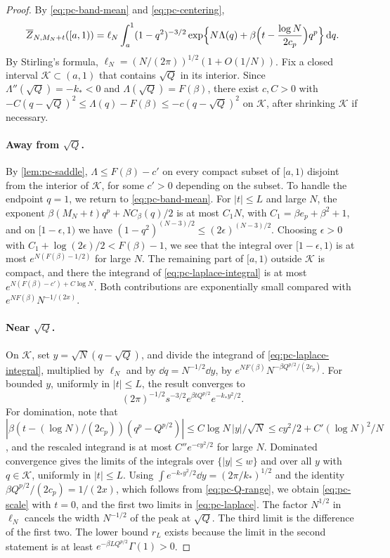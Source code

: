\begin{proof}
By \eqref{eq:pc-band-mean} and \eqref{eq:pc-centering},
\begin{equation}\label{eq:pc-laplace-integral}
\overline Z_{N,M_N+t}([a,1))=\ell_N\int_a^1(1-q^2)^{-3/2}\exp\Bigl\{N\Lambda(q)+\beta\Bigl(t-\frac{\log N}{2c_p}\Bigr)q^p\Bigr\}\,\mathrm d q.
\end{equation}
By Stirling's formula, $\ell_N=(N/(2\pi))^{1/2}(1+O(1/N))$. Fix a closed interval $\mathcal K\subset(a,1)$ that contains $\sqrt Q$ in its interior. Since $\Lambda''(\sqrt Q)=-k_*<0$ and $\Lambda(\sqrt Q)=F(\beta)$, there exist $c,C>0$ with $-C(q-\sqrt Q)^2\le\Lambda(q)-F(\beta)\le-c(q-\sqrt Q)^2$ on $\mathcal K$, after shrinking $\mathcal K$ if necessary.

\paragraph{Away from $\sqrt Q$.}
By \cref{lem:pc-saddle}, $\Lambda\le F(\beta)-c'$ on every compact subset of $[a,1)$ disjoint from the interior of $\mathcal K$, for some $c'>0$ depending on the subset. To handle the endpoint $q=1$, we return to \eqref{eq:pc-band-mean}. For $|t|\le L$ and large $N$, the exponent $\beta(M_N+t)q^p+NC_\beta(q)/2$ is at most $C_1N$, with $C_1=\beta e_p+\beta^2+1$, and on $[1-\epsilon,1)$ we have $(1-q^2)^{(N-3)/2}\le(2\epsilon)^{(N-3)/2}$. Choosing $\epsilon>0$ with $C_1+\log(2\epsilon)/2<F(\beta)-1$, we see that the integral over $[1-\epsilon,1)$ is at most $e^{N(F(\beta)-1/2)}$ for large $N$. The remaining part of $[a,1)$ outside $\mathcal K$ is compact, and there the integrand of \eqref{eq:pc-laplace-integral} is at most $e^{N(F(\beta)-c')+C\log N}$. Both contributions are exponentially small compared with $e^{NF(\beta)}N^{-1/(2x)}$.

\paragraph{Near $\sqrt Q$.}
On $\mathcal K$, set $y=\sqrt N(q-\sqrt Q)$, and divide the integrand of \eqref{eq:pc-laplace-integral}, multiplied by $\ell_N$ and by $\dd q=N^{-1/2}\dd y$, by $e^{NF(\beta)}N^{-\beta Q^{p/2}/(2c_p)}$. For bounded $y$, uniformly in $|t|\le L$, the result converges to
\[
(2\pi)^{-1/2}s^{-3/2}e^{\beta tQ^{p/2}}e^{-k_*y^2/2}.
\]
For domination, note that $|\beta(t-(\log N)/(2c_p))(q^p-Q^{p/2})|\le C\log N\,|y|/\sqrt N\le cy^2/2+C'(\log N)^2/N$, and the rescaled integrand is at most $C''e^{-cy^2/2}$ for large $N$. Dominated convergence gives the limits of the integrals over $\{|y|\le w\}$ and over all $y$ with $q\in\mathcal K$, uniformly in $|t|\le L$. Using $\int e^{-k_*y^2/2}\dd y=(2\pi/k_*)^{1/2}$ and the identity $\beta Q^{p/2}/(2c_p)=1/(2x)$, which follows from \eqref{eq:pc-Q-range}, we obtain \eqref{eq:pc-scale} with $t=0$, and the first two limits in \eqref{eq:pc-laplace}. The factor $N^{1/2}$ in $\ell_N$ cancels the width $N^{-1/2}$ of the peak at $\sqrt Q$. The third limit is the difference of the first two. The lower bound $r_L$ exists because the limit in the second statement is at least $e^{-\beta LQ^{p/2}}\Gamma(1)>0$.


\end{proof}
